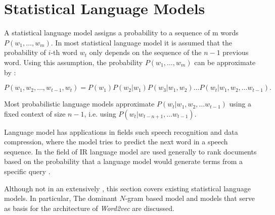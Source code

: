 





\section{Statistical Language Models}
\label{sec:relwork-language-models}

A statistical language model assigns a probability to a sequence of m
words $P(w_1,\ldots,w_m)$.  In most statistical language model it is assumed that the probability of $i$-th word $w_t$ only depends on the sequence of the $n-1$ previous word.  Using this assumption, the probability $P(w_1,\ldots,w_m)$ can be approximate by \cite{Bengio:2008}: 
% 


\begin{equation}
\label{eq:lm_probability}
 P(w_1, w_2, \ldots, w_{t-1},w_t) = P(w_1) P(w_2|w_1) P(w_3|w_1,w_2) \ldots 
  P(w_t | w_1, w_2, \ldots w_{t-1}).
\end{equation}

Most probabilistic language models  approximate $P(w_t | w_1, w_2, \ldots
w_{t-1})$ using a fixed context of size $n-1$, i.e. using  $P(w_t |
w_{t-n+1}, \ldots w_{t-1})$.

Language model has applications in fields such speech recognition and data
compression, where the model tries to predict the next word in a speech
sequence. In the field of \ac{IR} language model are used generally 
to rank documents based on the probability that a language model would
generate terms from a specific query \cite{Manning:1999:FSN:311445}.

Although not in an extensively , this section covers existing statistical language models. In particular, The dominant $N$-gram based model and models that
serve as basis for the architecture of  \textit{Word2vec} are discussed.


